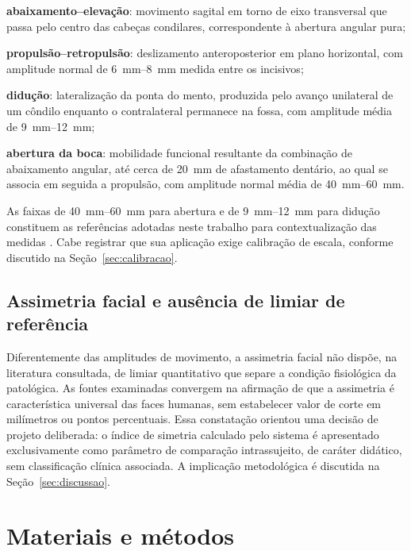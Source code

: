 \documentclass[
    article,
    11pt,
    oneside,
    a4paper,
    english,
    brazil
]{abntex2}
\begin{document}
\begin{alineas}
    \item \textbf{abaixamento--elevação}: movimento sagital em torno de eixo
    transversal que passa pelo centro das cabeças condilares, correspondente
    à abertura angular pura;
    \item \textbf{propulsão--retropulsão}: deslizamento anteroposterior em
    plano horizontal, com amplitude normal de \SIrange{6}{8}{\milli\metre}
    medida entre os incisivos;
    \item \textbf{didução}: lateralização da ponta do mento, produzida pelo
    avanço unilateral de um côndilo enquanto o contralateral permanece na
    fossa, com amplitude média de \SIrange{9}{12}{\milli\metre};
    \item \textbf{abertura da boca}: mobilidade funcional resultante da
    combinação de abaixamento angular, até cerca de
    \SI{20}{\milli\metre} de afastamento dentário, ao qual se associa em
    seguida a propulsão, com amplitude normal média de
    \SIrange{40}{60}{\milli\metre}.
\end{alineas}

As faixas de \SIrange{40}{60}{\milli\metre} para abertura e de
\SIrange{9}{12}{\milli\metre} para didução constituem as referências
adotadas neste trabalho para contextualização das medidas
\cite{dufour2016}. Cabe registrar que sua aplicação exige calibração de
escala, conforme discutido na Seção~\ref{sec:calibracao}.

\subsection{Assimetria facial e ausência de limiar de referência}
\label{sec:assimetria}

Diferentemente das amplitudes de movimento, a assimetria facial não dispõe,
na literatura consultada, de limiar quantitativo que separe a condição
fisiológica da patológica. As fontes examinadas convergem na afirmação de
que a assimetria é característica universal das faces humanas, sem
estabelecer valor de corte em milímetros ou pontos percentuais. Essa
constatação orientou uma decisão de projeto deliberada: o índice de
simetria calculado pelo sistema é apresentado exclusivamente como parâmetro
de comparação intrassujeito, de caráter didático, sem classificação
clínica associada. A implicação metodológica é discutida na
Seção~\ref{sec:discussao}.

\section{Materiais e métodos}
\end{document}
